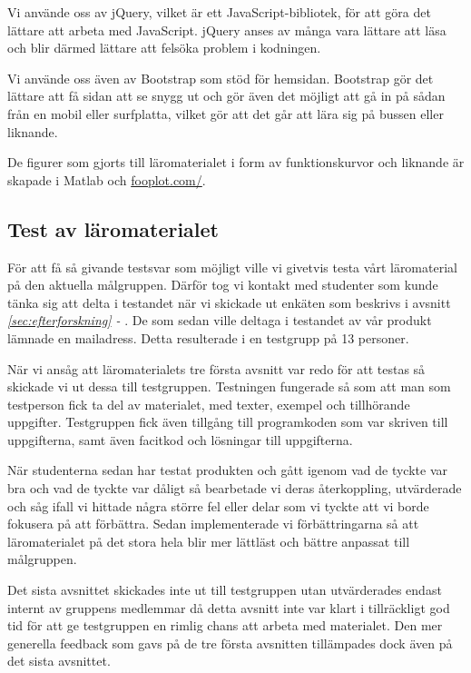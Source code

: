 \documentclass[12pt,a4paper,twoside,openright]{article}
\begin{document}
Vi använde oss av jQuery, vilket är ett JavaScript-bibliotek, för att
göra det lättare att arbeta med JavaScript. jQuery anses av många vara
lättare att läsa och blir därmed lättare att felsöka problem i
kodningen.

Vi använde oss även av Bootstrap som stöd för hemsidan. Bootstrap gör
det lättare att få sidan att se snygg ut och gör även det möjligt att
gå in på sådan från en mobil eller surfplatta, vilket gör att det går
att lära sig på bussen eller liknande.

De figurer som gjorts till läromaterialet i form av funktionskurvor
och liknande är skapade i Matlab och \url{fooplot.com/}.

\subsection{Test av läromaterialet}
\label{sec:test}

För att få så givande testsvar som möjligt ville vi givetvis testa
vårt läromaterial på den aktuella målgruppen. Därför tog vi kontakt
med studenter som kunde tänka sig att delta i testandet när vi
skickade ut enkäten som beskrivs i avsnitt \textit{\ref{sec:efterforskning} -
}. De som
sedan ville deltaga i testandet av vår produkt lämnade en
mailadress. Detta resulterade i en testgrupp på 13 personer.

När vi ansåg att läromaterialets tre första avsnitt var redo för att
testas så skickade vi ut dessa till testgruppen. Testningen fungerade så
som att man som testperson fick ta del av materialet, med texter,
exempel och tillhörande uppgifter. Testgruppen fick även tillgång till
programkoden som var skriven till uppgifterna, samt även facitkod och
lösningar till uppgifterna.

När studenterna sedan har testat produkten och gått igenom vad de
tyckte var bra och vad de tyckte var dåligt så bearbetade vi deras
återkoppling, utvärderade och såg ifall vi hittade några större fel
eller delar som vi tyckte att vi borde fokusera på att
förbättra. Sedan implementerade vi förbättringarna så att
läromaterialet på det stora hela blir mer lättläst och bättre anpassat
till målgruppen.

Det sista avsnittet skickades inte ut till testgruppen utan
utvärderades endast internt av gruppens medlemmar då detta avsnitt
inte var klart i tillräckligt god tid för att ge testgruppen en rimlig
chans att arbeta med materialet. Den mer generella feedback som gavs
på de tre första avsnitten tillämpades dock även på det sista
avsnittet.
\end{document}

